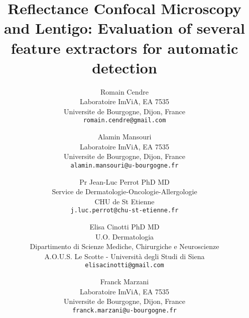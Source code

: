 \title{Reflectance Confocal Microscopy and Lentigo: Evaluation of several feature extractors for automatic detection}

\author{Romain Cendre\\
Laboratoire ImViA, EA 7535\\
Universite de Bourgogne, Dijon, France\\
{\tt\small romain.cendre@gmail.com}
\and
Alamin Mansouri\\
Laboratoire ImViA, EA 7535\\
Universite de Bourgogne, Dijon, France\\
{\tt\small alamin.mansouri@u-bourgogne.fr}
\and
Pr Jean-Luc Perrot PhD MD\\
Service de Dermatologie-Oncologie-Allergologie\\
CHU de St Etienne\\
{\tt\small j.luc.perrot@chu-st-etienne.fr}
\and
Elisa Cinotti PhD MD\\
U.O. Dermatologia\\
Dipartimento di Scienze Mediche, Chirurgiche e Neuroscienze\\
A.O.U.S. Le Scotte - Università degli Studi di Siena\\
{\tt\small elisacinotti@gmail.com}
\and
Franck Marzani\\
Laboratoire ImViA, EA 7535\\
Universite de Bourgogne, Dijon, France\\
{\tt\small franck.marzani@u-bourgogne.fr}
}
